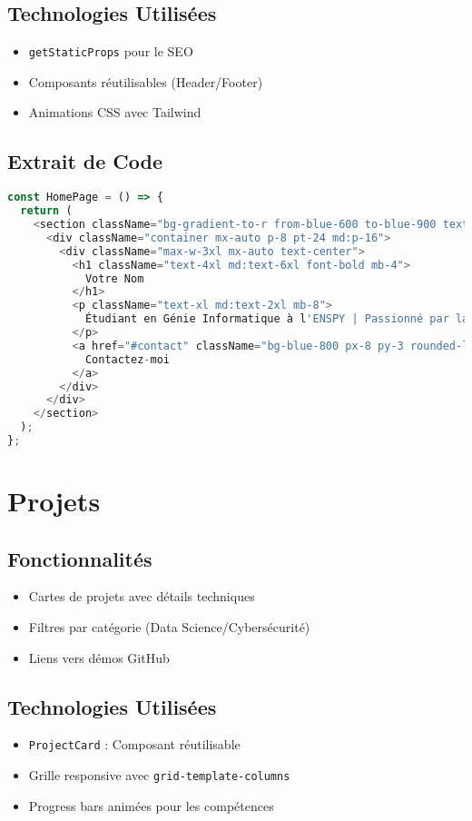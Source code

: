 \documentclass[12pt,a4paper]{report}
\begin{document}
\subsection{Technologies Utilisées}
\begin{itemize}
\item \texttt{getStaticProps} pour le SEO
\item Composants réutilisables (Header/Footer)
\item Animations CSS avec Tailwind
\end{itemize}

\subsection{Extrait de Code}
\begin{lstlisting}[language=TypeScript,caption=Hero Section]
const HomePage = () => {
  return (
    <section className="bg-gradient-to-r from-blue-600 to-blue-900 text-white min-h-screen">
      <div className="container mx-auto p-8 pt-24 md:p-16">
        <div className="max-w-3xl mx-auto text-center">
          <h1 className="text-4xl md:text-6xl font-bold mb-4">
            Votre Nom
          </h1>
          <p className="text-xl md:text-2xl mb-8">
            Étudiant en Génie Informatique à l'ENSPY | Passionné par la Science des Données et la Cybersécurité
          </p>
          <a href="#contact" className="bg-blue-800 px-8 py-3 rounded-lg hover:bg-blue-900 transition-colors">
            Contactez-moi
          </a>
        </div>
      </div>
    </section>
  );
};
\end{lstlisting}

\section{Projets}
\subsection{Fonctionnalités}
\begin{itemize}
\item Cartes de projets avec détails techniques
\item Filtres par catégorie (Data Science/Cybersécurité)
\item Liens vers démos GitHub
\end{itemize}

\subsection{Technologies Utilisées}
\begin{itemize}
\item \texttt{ProjectCard} : Composant réutilisable
\item Grille responsive avec \texttt{grid-template-columns}
\item Progress bars animées pour les compétences
\end{itemize}
\end{document}
